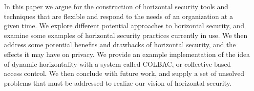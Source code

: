 In this paper we argue for the construction of horizontal security tools and
techniques that are flexible and respond to the needs of an organization at a
given time. We explore different potential approaches to horizontal security,
and examine some examples of horizontal security practices currently in use. We
then address some potential benefits and drawbacks of horizontal security, and
the effects it may have on privacy. We provide an example implementation of the
idea of dynamic horizontality with a system called COLBAC, or collective based
access control. We then conclude with future work, and supply a set of unsolved
problems that must be addressed to realize our vision of horizontal security.
